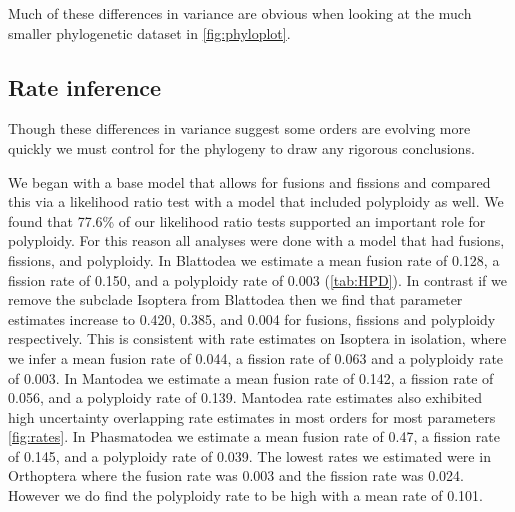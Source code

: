Much of these differences in variance are obvious when looking at the much smaller phylogenetic dataset in \cref{fig:phyloplot}.

\subsection{Rate inference}
Though these differences in variance suggest some orders are evolving more quickly we must control for the phylogeny to draw any rigorous conclusions.

We began with a base model that allows for fusions and fissions and compared this via a likelihood ratio test with a model that included polyploidy as well.
We found that 77.6\% of our likelihood ratio tests supported an important role for polyploidy.
For this reason all analyses were done with a model that had fusions, fissions, and polyploidy.
In Blattodea we estimate a mean fusion rate of 0.128, a fission rate of 0.150, and a polyploidy rate of 0.003 (\cref{tab:HPD}).
In contrast if we remove the subclade Isoptera from Blattodea then we find that parameter estimates increase to 0.420, 0.385, and 0.004 for fusions, fissions and polyploidy respectively.
This is consistent with rate estimates on Isoptera in isolation, where we infer a mean fusion rate of 0.044, a fission rate of 0.063 and a polyploidy rate of 0.003.
In Mantodea we estimate a mean fusion rate of 0.142, a fission rate of 0.056, and a polyploidy rate of 0.139.
Mantodea rate estimates also exhibited high uncertainty overlapping rate estimates in most orders for most parameters \cref{fig:rates}.
In Phasmatodea we estimate a mean fusion rate of 0.47, a fission rate of 0.145, and a polyploidy rate of 0.039.
The lowest rates we estimated were in Orthoptera where the fusion rate was 0.003 and the fission rate was 0.024. However we do find the polyploidy rate to be high with a mean rate of 0.101.



